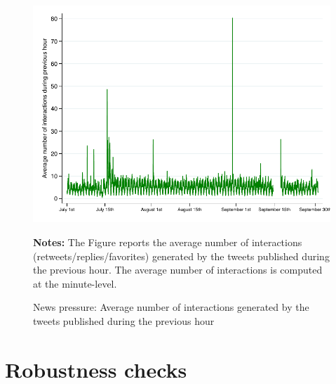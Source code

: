 \clearpage
\pagebreak
\begin{figure}
\begin{center}
\includegraphics[scale=1]{figures/news_pressure_hour_illustration}
\end{center}
	\begin{spacing}{0.5}
		{\footnotesize \textbf{Notes:} The Figure reports the average number of interactions (retweets/replies/favorites) generated by the tweets published during the previous hour. The average number of interactions is computed at the minute-level.}
	\end{spacing}
\vspace{.5cm}	
	\caption{News pressure: Average number of interactions generated by the tweets published during the previous hour}
	\label{fig:news_pressure_hour_illustration}
\end{figure}

\clearpage 
\pagebreak
\section{Robustness checks \label{Sec:OARobust}}

